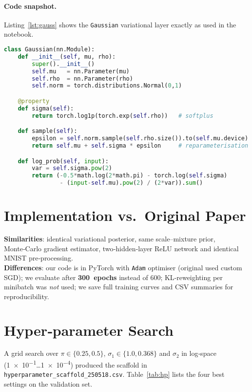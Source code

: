 \documentclass{article}
\begin{document}
\paragraph{Code snapshot.} Listing~\ref{lst:gauss} shows the \texttt{Gaussian} variational layer exactly as used in the notebook.
\begin{lstlisting}[language=python, caption={Variational Gaussian layer (excerpt).}, label={lst:gauss}]
class Gaussian(nn.Module):
    def __init__(self, mu, rho):
        super().__init__()
        self.mu   = nn.Parameter(mu)
        self.rho  = nn.Parameter(rho)
        self.norm = torch.distributions.Normal(0,1)

    @property
    def sigma(self):
        return torch.log1p(torch.exp(self.rho))   # softplus

    def sample(self):
        epsilon = self.norm.sample(self.rho.size()).to(self.mu.device)
        return self.mu + self.sigma * epsilon     # reparameterisation

    def log_prob(self, input):
        var = self.sigma.pow(2)
        return (-0.5*math.log(2*math.pi) - torch.log(self.sigma)
                - (input-self.mu).pow(2) / (2*var)).sum()
\end{lstlisting}

\section{Implementation vs.\ Original Paper}
\textbf{Similarities}: identical variational posterior, same scale–mixture prior, Monte‑Carlo gradient estimator, two‑hidden‑layer ReLU network and identical MNIST pre‑processing.\\
\textbf{Differences}: our code is in PyTorch with \texttt{Adam} optimiser (original used custom SGD); we evaluate after \textbf{300~epochs} instead of 600; KL‐reweighting per minibatch was \emph{not} used; we save full training curves and CSV summaries for reproducibility.

\section{Hyper‑parameter Search}
A grid search over $\pi\!\in\!\{0.25,0.5\}$, $\sigma_1\!\in\!\{1.0,0.368\}$ and $\sigma_2$ in log‑space (\num{1e-1}…\num{1e-4}) produced the scaffold in \texttt{hyperparameter\_scaffold\_250518.csv}. %
Table~\ref{tab:hp} lists the four best settings on the validation set.
\end{document}
